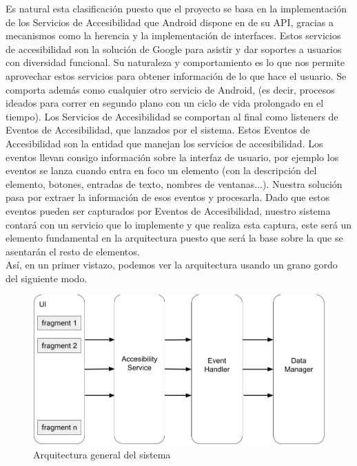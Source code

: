 \documentclass[12pt,a4paper,oneside]{book} %
\begin{document}
Es natural esta clasificación puesto que el proyecto se basa en la implementación de los Servicios de Accesibilidad que Android dispone en de su API, gracias a mecanismos como la herencia y la implementación de interfaces. 
\newline \newline
Estos servicios de accesibilidad son la solución de Google para asistir y dar soportes a usuarios con diversidad funcional. Su naturaleza y comportamiento es lo que nos permite aprovechar estos servicios para obtener información de lo que hace el usuario. 
\newline \newline
Se comporta además como cualquier otro servicio de Android, (es decir, procesos ideados para correr en segundo plano con un ciclo de vida prolongado en el tiempo). Los Servicios de Accesibilidad se comportan al final como listeners de Eventos de Accesibilidad, que lanzados por el sistema. Estos Eventos de Accesibilidad son la entidad que manejan los servicios de accesibilidad. 
\newline \newline
Los eventos llevan consigo información sobre la interfaz de usuario, por ejemplo los eventos se lanza cuando entra en foco un elemento (con la descripción del elemento, botones, entradas de texto, nombres de ventanas...). Nuestra solución pasa por extraer la información de esos eventos y procesarla. 
\newline \newline
Dado que estos eventos pueden ser capturados por Eventos de Accesibilidad, nuestro sistema contará con un servicio que lo implemente y que realiza esta captura, este será un elemento fundamental en la arquitectura puesto que será la base sobre la que se asentarán el resto de elementos. 
\\
Así, en un primer vistazo, podemos ver la arquitectura usando un grano gordo del siguiente modo. 
\begin{figure}[H]
	\begin{center}
		\includegraphics[scale=0.3]{pictures/architecture/arquitecturaGeneral02.png} 
	\end{center}
	\caption[Arquitectura general del sistema]{Arquitectura general del sistema}
\end{figure}
\end{document}
